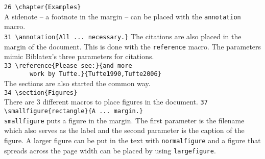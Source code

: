 \documentclass[]{caesar_book}
\begin{document}
\verb+26 \chapter{Examples}+\\
A sidenote – a footnote in the margin – can be placed with the \texttt{annotation} macro.\\
\verb+31 \annotation{All ... necessary.}+
The citations are also placed in the margin of the document. This is done with the \texttt{reference} macro. The parameters mimic Biblatex's three parameters for citations.\\
\verb+33 \reference{Please see:}{and more +\\
\verb+       work by Tufte.}{Tufte1990,Tufte2006}+\\
The sections are also started the common way.\\
\verb+34 \section{Figures}+\\
There are 3 different macros to place figures in the document.
\verb+37 \smallfigure{rectangle}{A ... margin.}+\\
\texttt{smallfigure} puts a figure in the margin. The first parameter is the filename which also serves as the label and the second parameter is the caption of the figure. A larger figure can be put in the text with \texttt{normalfigure} and a figure that spreads across the page width can be placed by using \texttt{largefigure}.
\end{document}
